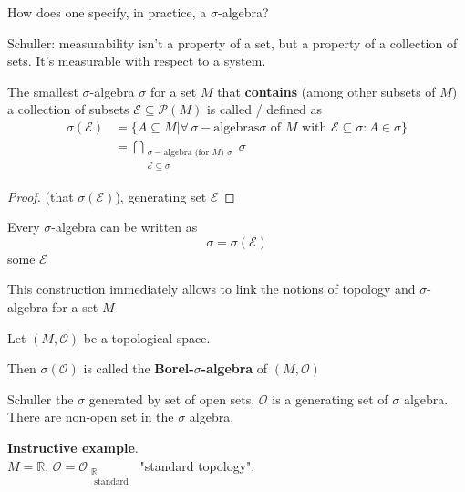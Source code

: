 How does one specify, in practice, a $\sigma$-algebra?

Schuller: measurability isn't a property of a set, but a property of a collection of sets. It's measurable with respect to a system.

\begin{definition}
	\begin{theorem}
		The smallest $\sigma$-algebra $\sigma$ for a set $M$ that \textbf{contains} (among other subsets of $M$) a collection of subsets $\mathcal{E} \subseteq \mathcal{P}(M)$ is called / defined as 
		\[
		\begin{aligned}
		\sigma(\mathcal{E}) & = \lbrace A \subseteq M | \forall \, \sigma-\text{algebras} \sigma \text{ of } M \text{ with } \mathcal{E} \subseteq \sigma: A \in \sigma \rbrace \\
		& = \bigcap_{\substack{ \sigma-\text{algebra (for $M$) } \sigma \\ \mathcal{E} \subseteq \sigma } } \sigma
		\end{aligned}
		\]
	\end{theorem}
\end{definition}

\begin{proof}
	(that $\sigma(\mathcal{E})$), generating set $\mathcal{E}$
\end{proof}

\begin{theorem}
	Every $\sigma$-algebra can be written as
	\[
	\sigma = \sigma(\mathcal{E})
	\] some $\mathcal{E}$

This construction immediately allows to link the notions of topology and $\sigma$-algebra for a set $M$
\end{theorem}

\begin{definition}
	Let $(M, \mathcal{O})$ be a topological space.
	
	Then $\sigma(\mathcal{O})$ is called the \textbf{Borel-$\sigma$-algebra} of $(M, \mathcal{O})$
\end{definition}
Schuller the $\sigma$ generated by set of open sets. $\mathcal{O}$ is a generating set of $\sigma$ algebra. There are non-open set in the $\sigma$ algebra.

\textbf{Instructive example}. \\
$M = \mathbb{R}$, $\mathcal{O} = \mathcal{O}_{ \substack{ \mathbb{R} \\ \text{ standard } } }$ "standard topology". \\

